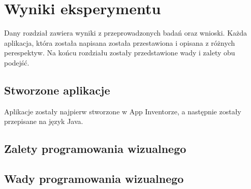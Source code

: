 \chapter{Wyniki eksperymentu}
\label{c5}

Dany rozdział zawiera wyniki z przeprowadzonych badań oraz wnioski. Każda aplikacja, która została napisana została przestawiona i opisana z różnych perespektyw. Na końcu rozdziału zostały przedstawione wady i zalety obu podejść.

\section{Stworzone aplikacje}

Aplikacje zostały najpierw stworzone w App Inventorze, a następnie zostały przepisane na język Java.

\section{Zalety programowania wizualnego}

\section{Wady programowania wizualnego}
